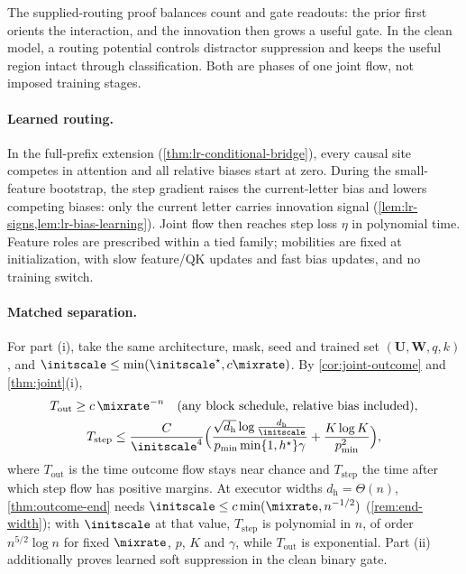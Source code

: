 The supplied-routing proof balances count and gate readouts: the prior first orients the
interaction, and the innovation then grows a useful gate. In the clean model, a routing
potential controls distractor suppression and keeps the useful region intact through
classification. Both are phases of one joint flow, not imposed training stages.

\paragraph{Learned routing.}
In the full-prefix extension (\cref{thm:lr-conditional-bridge}), every causal site competes in attention
and all relative biases start at zero. During the small-feature bootstrap, the step gradient raises
the current-letter bias and lowers competing biases: only the current letter carries innovation
signal (\cref{lem:lr-signs,lem:lr-bias-learning}). Joint flow then reaches step loss $\eta$ in
polynomial time. Feature roles are prescribed within a tied family; mobilities are fixed at
initialization, with slow feature/QK updates and fast bias updates, and no training switch.

\paragraph{Matched separation.} For part (i), take the same architecture, mask, seed and trained set $(\mathbf U,\mathbf W,q,k)$, and $\initscale\le\min(\initscale^\star,c\mixrate)$.
By \cref{cor:joint-outcome} and \cref{thm:joint}(i),
\begin{gather*}
 T_{\mathrm{out}}\ge c\,\mixrate^{-n}\quad\text{(any block schedule, relative bias included)},\\
 T_{\mathrm{step}}\le\frac{C}{\initscale^4}\Bigl(\frac{\sqrt{d_{\mathrm h}}\log\frac{d_{\mathrm h}}{\initscale}}{p_{\min}\min\{1,h^\star\}\gamma}+\frac{K\log K}{p_{\min}^2}\Bigr),
\end{gather*}
where $T_{\mathrm{out}}$ is the time outcome flow stays near chance and $T_{\mathrm{step}}$ the time after which step flow has positive margins. At executor
widths $d_{\mathrm h}=\Theta(n)$, \cref{thm:outcome-end} needs $\initscale\le c\min(\mixrate,n^{-1/2})$ (\cref{rem:end-width}); with $\initscale$ at that value, $T_{\mathrm{step}}$ is polynomial
in $n$, of order $n^{5/2}\log n$ for fixed $\mixrate$, $p$, $K$ and $\gamma$, while $T_{\mathrm{out}}$ is exponential. Part (ii) additionally proves learned soft suppression in the clean binary gate.

